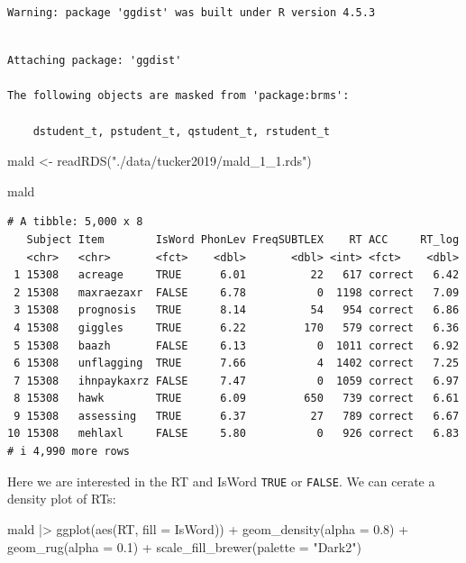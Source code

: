 \documentclass[
  letterpaper,
  DIV=11,
  numbers=noendperiod]{scrartcl}
\newenvironment{Shaded}{\begin{snugshade}}{\end{snugshade}}
\newcommand{\AttributeTok}[1]{\textcolor[rgb]{0.40,0.45,0.13}{#1}}
\newcommand{\FloatTok}[1]{\textcolor[rgb]{0.68,0.00,0.00}{#1}}
\newcommand{\FunctionTok}[1]{\textcolor[rgb]{0.28,0.35,0.67}{#1}}
\newcommand{\NormalTok}[1]{\textcolor[rgb]{0.00,0.23,0.31}{#1}}
\newcommand{\OtherTok}[1]{\textcolor[rgb]{0.00,0.23,0.31}{#1}}
\newcommand{\SpecialCharTok}[1]{\textcolor[rgb]{0.37,0.37,0.37}{#1}}
\newcommand{\StringTok}[1]{\textcolor[rgb]{0.13,0.47,0.30}{#1}}
\begin{document}
\begin{verbatim}
Warning: package 'ggdist' was built under R version 4.5.3
\end{verbatim}

\begin{verbatim}

Attaching package: 'ggdist'

The following objects are masked from 'package:brms':

    dstudent_t, pstudent_t, qstudent_t, rstudent_t
\end{verbatim}

\begin{Shaded}
\begin{Highlighting}[]
\NormalTok{mald }\OtherTok{\textless{}{-}} \FunctionTok{readRDS}\NormalTok{(}\StringTok{"./data/tucker2019/mald\_1\_1.rds"}\NormalTok{)}

\NormalTok{mald}
\end{Highlighting}
\end{Shaded}

\begin{verbatim}
# A tibble: 5,000 x 8
   Subject Item        IsWord PhonLev FreqSUBTLEX    RT ACC     RT_log
   <chr>   <chr>       <fct>    <dbl>       <dbl> <int> <fct>    <dbl>
 1 15308   acreage     TRUE      6.01          22   617 correct   6.42
 2 15308   maxraezaxr  FALSE     6.78           0  1198 correct   7.09
 3 15308   prognosis   TRUE      8.14          54   954 correct   6.86
 4 15308   giggles     TRUE      6.22         170   579 correct   6.36
 5 15308   baazh       FALSE     6.13           0  1011 correct   6.92
 6 15308   unflagging  TRUE      7.66           4  1402 correct   7.25
 7 15308   ihnpaykaxrz FALSE     7.47           0  1059 correct   6.97
 8 15308   hawk        TRUE      6.09         650   739 correct   6.61
 9 15308   assessing   TRUE      6.37          27   789 correct   6.67
10 15308   mehlaxl     FALSE     5.80           0   926 correct   6.83
# i 4,990 more rows
\end{verbatim}

Here we are interested in the RT and IsWord \texttt{TRUE} or
\texttt{FALSE}. We can cerate a density plot of RTs:

\begin{Shaded}
\begin{Highlighting}[]
\NormalTok{mald }\SpecialCharTok{|\textgreater{}}
  \FunctionTok{ggplot}\NormalTok{(}\FunctionTok{aes}\NormalTok{(RT, }\AttributeTok{fill =}\NormalTok{ IsWord)) }\SpecialCharTok{+}
  \FunctionTok{geom\_density}\NormalTok{(}\AttributeTok{alpha =} \FloatTok{0.8}\NormalTok{) }\SpecialCharTok{+}
  \FunctionTok{geom\_rug}\NormalTok{(}\AttributeTok{alpha =} \FloatTok{0.1}\NormalTok{) }\SpecialCharTok{+}
  \FunctionTok{scale\_fill\_brewer}\NormalTok{(}\AttributeTok{palette =} \StringTok{"Dark2"}\NormalTok{) }
\end{Highlighting}
\end{Shaded}
\end{document}
